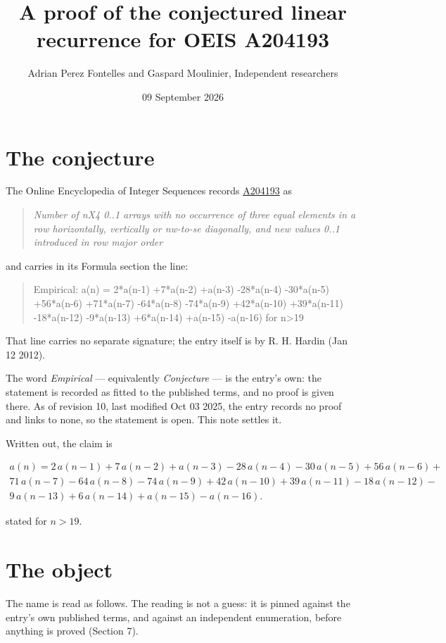 \documentclass[11pt]{article}
\title{A proof of the conjectured linear recurrence for OEIS A204193}
\author{Adrian Perez Fontelles and Gaspard Moulinier, Independent researchers}
\date{09 September 2026}
\theoremstyle{definition}
\begin{document}
\maketitle
\section{The conjecture}

The Online Encyclopedia of Integer Sequences records \href{https://oeis.org/A204193}{A204193} as

\begin{quote}\itshape Number of nX4 0..1 arrays with no occurrence of three equal elements in a row horizontally, vertically or nw-to-se diagonally, and new values 0..1 introduced in row major order\end{quote}

and carries in its Formula section the line:

\begin{quote}\ttfamily Empirical: a(n) = 2*a(n-1) +7*a(n-2) +a(n-3) -28*a(n-4) -30*a(n-5) +56*a(n-6) +71*a(n-7) -64*a(n-8) -74*a(n-9) +42*a(n-10) +39*a(n-11) -18*a(n-12) -9*a(n-13) +6*a(n-14) +a(n-15) -a(n-16) for n>19\end{quote}

That line carries no separate signature; the entry itself is by R. H. Hardin (Jan 12 2012).

The word {\itshape Empirical} --- equivalently {\itshape Conjecture} --- is the entry's own: the statement is recorded as fitted to the published terms, and no proof is given there. As of revision 10, last modified Oct 03 2025, the entry records no proof and links to none, so the statement is open. This note settles it.

Written out, the claim is

\begin{multline*} a(n) = 2\,a(n-1) + 7\,a(n-2) + a(n-3) - 28\,a(n-4) - 30\,a(n-5) + 56\,a(n-6) + \\ 71\,a(n-7) - 64\,a(n-8) - 74\,a(n-9) + 42\,a(n-10) + 39\,a(n-11) - 18\,a(n-12) - \\ 9\,a(n-13) + 6\,a(n-14) + a(n-15) - a(n-16). \end{multline*}

stated for $n > 19$.

\section{The object}

The name is read as follows. The reading is not a guess: it is pinned against the entry's own published terms, and against an independent enumeration, before anything is proved (Section 7).
\end{document}
